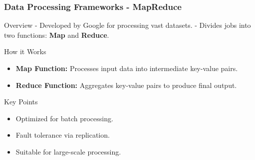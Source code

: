\documentclass[aspectratio=169]{beamer}
\begin{document}
\begin{frame}[fragile]
    \frametitle{Data Processing Frameworks - MapReduce}
    \begin{block}{Overview}
        - Developed by Google for processing vast datasets.
        - Divides jobs into two functions: \textbf{Map} and \textbf{Reduce}.
    \end{block}
    
    \begin{block}{How it Works}
        \begin{itemize}
            \item \textbf{Map Function:} Processes input data into intermediate key-value pairs.
            \item \textbf{Reduce Function:} Aggregates key-value pairs to produce final output.
        \end{itemize}
    \end{block}
    
    \begin{block}{Key Points}
        \begin{itemize}
            \item Optimized for batch processing.
            \item Fault tolerance via replication.
            \item Suitable for large-scale processing.
        \end{itemize}
    \end{block}
\end{frame}
\end{document}
